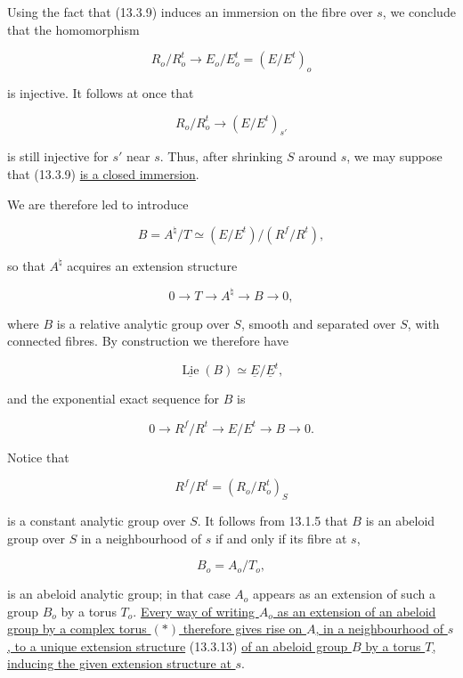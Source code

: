 \noindent
Using the fact that (13.3.9) induces an immersion on the fibre over $s$,
we conclude that the homomorphism

\begin{equation*}
 R_o/R_o^t\longrightarrow E_o/E_o^t=(E/E^t)_o
\end{equation*}

\noindent
is injective. It follows at once that

\begin{equation*}
 R_o/R_o^t\longrightarrow(E/E^t)_{s'}
\end{equation*}

\noindent
is still injective for $s'$ near $s$. Thus, after shrinking $S$ around
$s$, we may suppose that (13.3.9) \underline{is a closed immersion}.

We are therefore led to introduce

\begin{equation}\tag{13.3.12}
 B=A^\natural/T\simeq(E/E^t)/(R^f/R^t),
\end{equation}

\noindent
so that $A^\natural$ acquires an extension structure

\begin{equation}\tag{13.3.13}
 0\longrightarrow T\longrightarrow A^\natural
 \longrightarrow B\longrightarrow0,
\end{equation}

\noindent
where $B$ is a relative analytic group over $S$, smooth and separated
over $S$, with connected fibres. By construction we therefore have

\begin{equation}\tag{13.3.14}
 \underline{\operatorname{Lie}}(B)\simeq
 \underline E/\underline E^t,
\end{equation}

\noindent
and the exponential exact sequence for $B$ is

\begin{equation}\tag{13.3.15}
 0\longrightarrow R^f/R^t\longrightarrow E/E^t
 \longrightarrow B\longrightarrow0.
\end{equation}

\noindent
Notice that

\begin{equation}\tag{13.3.16}
 R^f/R^t=(R_o/R_o^t)_S
\end{equation}

\noindent
is a constant analytic group over $S$. It follows from 13.1.5 that $B$
is an abeloid group over $S$ in a neighbourhood of $s$ if and only if
its fibre at $s$,

\begin{equation*}
 B_o=A_o/T_o,
\end{equation*}

\noindent
is an abeloid analytic group; in that case $A_o$ appears as an extension
of such a group $B_o$ by a torus $T_o$. \underline{Every way of writing
$A_o$ as an extension of an abeloid group by a complex torus $(*)$
therefore gives rise on $A$, in a neighbourhood of $s$, to a unique
extension structure} (13.3.13) \underline{of an abeloid group $B$ by a
torus $T$, inducing the given extension structure at $s$}.
